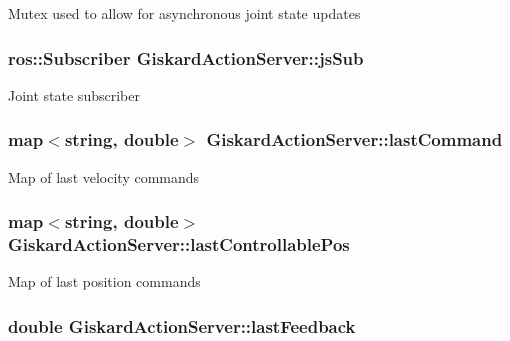 Mutex used to allow for asynchronous joint state updates \hypertarget{classGiskardActionServer_a4197a9f1da3c9832d4bf7786bffa82ff}{
\subsubsection[{js\-Sub}]{\setlength{\rightskip}{0pt plus 5cm}ros\-::\-Subscriber Giskard\-Action\-Server\-::js\-Sub\hspace{0.3cm}{\ttfamily [private]}}}\label{classGiskardActionServer_a4197a9f1da3c9832d4bf7786bffa82ff}
Joint state subscriber \hypertarget{classGiskardActionServer_a965e4f058e16f29b8a6516d7fd6d45ad}{
\subsubsection[{last\-Command}]{\setlength{\rightskip}{0pt plus 5cm}map$<$string, double$>$ Giskard\-Action\-Server\-::last\-Command\hspace{0.3cm}{\ttfamily [protected]}}}\label{classGiskardActionServer_a965e4f058e16f29b8a6516d7fd6d45ad}
Map of last velocity commands \hypertarget{classGiskardActionServer_a02213acb96763c0283668a519903e440}{
\subsubsection[{last\-Controllable\-Pos}]{\setlength{\rightskip}{0pt plus 5cm}map$<$string, double$>$ Giskard\-Action\-Server\-::last\-Controllable\-Pos\hspace{0.3cm}{\ttfamily [protected]}}}\label{classGiskardActionServer_a02213acb96763c0283668a519903e440}
Map of last position commands \hypertarget{classGiskardActionServer_a17640817711388e121902779b66a3657}{
\subsubsection[{last\-Feedback}]{\setlength{\rightskip}{0pt plus 5cm}double Giskard\-Action\-Server\-::last\-Feedback\hspace{0.3cm}{\ttfamily [private]}}}\label{classGiskardActionServer_a17640817711388e121902779b66a3657}
